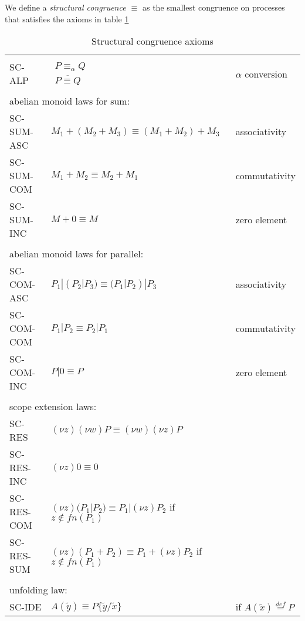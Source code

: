 
\begin{definition}
  We define a \emph{structural congruence $\equiv$} as the smallest congruence on processes that satisfies the axioms in table \ref{structuralcongrunce}
  \begin{table}
    \begin{tabular}{lll}
      \hline\\
	SC-ALP&$\begin{array}{c}P \equiv_{\alpha} Q\\\overline{P\equiv Q}\end{array}$&$\alpha$ conversion
      \\\\
	\multicolumn{3}{l}{abelian monoid laws for sum:}
      \\
	SC-SUM-ASC& $M_{1}+(M_{2}+M_{3})\equiv (M_{1}+M_{2})+M_{3}$ &associativity
      \\
	SC-SUM-COM& $M_{1}+M_{2}\equiv M_{2}+M_{1}$ &commutativity
      \\
	SC-SUM-INC& $M+0\equiv M$&zero element
      \\\\
	\multicolumn{3}{l}{abelian monoid laws for parallel:}
      \\
	SC-COM-ASC& $P_{1}|(P_{2}|P_{3})\equiv (P_{1}|P_{2})|P_{3}$ &associativity
      \\
	SC-COM-COM& $P_{1}|P_{2}\equiv P_{2}|P_{1}$ &commutativity
      \\
	SC-COM-INC& $P|0\equiv P$&zero element
      \\\\
	\multicolumn{3}{l}{scope extension laws:}
      \\
	SC-RES& $(\nu z) (\nu w) P \equiv (\nu w) (\nu z) P$ &
      \\
	SC-RES-INC& $(\nu z) 0 \equiv 0$ &
      \\
	SC-RES-COM& $(\nu z) (P_{1}|P_{2}) \equiv P_{1}|(\nu z) P_{2}$ if $z\notin fn(P_{1})$&
      \\
	SC-RES-SUM& $(\nu z) (P_{1}+P_{2}) \equiv P_{1}+(\nu z) P_{2}$ if $z\notin fn(P_{1})$&
      \\\\
	\multicolumn{3}{l}{unfolding law:}
      \\
	SC-IDE&$A(\tilde{y})\equiv P\{\tilde{y}/\tilde{x}\}$&if $A(\tilde{x})\stackrel{def}{=}P$
      \\\hline
    \end{tabular}
    \caption{Structural congruence axioms}
    \label{structuralcongrunce}
  \end{table}
\end{definition}

